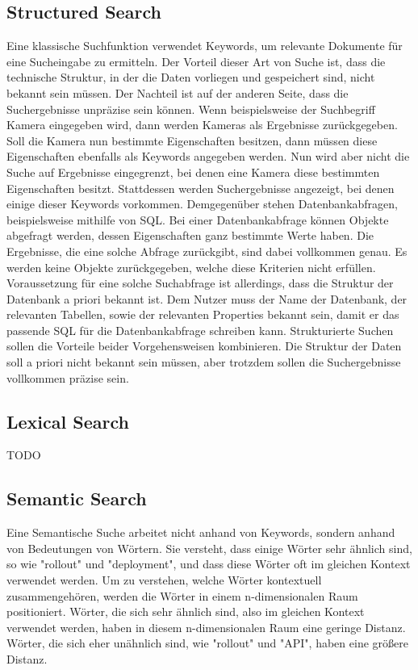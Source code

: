 \subsection{Structured Search}
Eine klassische Suchfunktion verwendet Keywords, um relevante Dokumente für eine Sucheingabe zu ermitteln.
Der Vorteil dieser Art von Suche ist, dass die technische Struktur, in der die Daten vorliegen und gespeichert sind, nicht bekannt sein müssen.
Der Nachteil ist auf der anderen Seite, dass die Suchergebnisse unpräzise sein können.
Wenn beispielsweise der Suchbegriff Kamera eingegeben wird, dann werden Kameras als Ergebnisse zurückgegeben.
Soll die Kamera nun bestimmte Eigenschaften besitzen, dann müssen diese Eigenschaften ebenfalls als Keywords angegeben werden.
Nun wird aber nicht die Suche auf Ergebnisse eingegrenzt, bei denen eine Kamera diese bestimmten Eigenschaften besitzt.
Stattdessen werden Suchergebnisse angezeigt, bei denen einige dieser Keywords vorkommen.
Demgegenüber stehen Datenbankabfragen, beispielsweise mithilfe von SQL.
Bei einer Datenbankabfrage können Objekte abgefragt werden, dessen Eigenschaften ganz bestimmte Werte haben.
Die Ergebnisse, die eine solche Abfrage zurückgibt, sind dabei vollkommen genau.
Es werden keine Objekte zurückgegeben, welche diese Kriterien nicht erfüllen.
Voraussetzung für eine solche Suchabfrage ist allerdings, dass die Struktur der Datenbank a priori bekannt ist.
Dem Nutzer muss der Name der Datenbank, der relevanten Tabellen, sowie der relevanten Properties bekannt sein, damit er das passende SQL für die Datenbankabfrage schreiben kann.
Strukturierte Suchen sollen die Vorteile beider Vorgehensweisen kombinieren.
Die Struktur der Daten soll a priori nicht bekannt sein müssen, aber trotzdem sollen die Suchergebnisse vollkommen präzise sein.


\subsection{Lexical Search}
TODO

\subsection{Semantic Search}
Eine Semantische Suche arbeitet nicht anhand von Keywords, sondern anhand von Bedeutungen von Wörtern.
Sie versteht, dass einige Wörter sehr ähnlich sind, so wie "rollout" und "deployment", und dass diese Wörter oft im gleichen Kontext verwendet werden.
Um zu verstehen, welche Wörter kontextuell zusammengehören, werden die Wörter in einem n-dimensionalen Raum positioniert.
Wörter, die sich sehr ähnlich sind, also im gleichen Kontext verwendet werden, haben in diesem n-dimensionalen Raum eine geringe Distanz.
Wörter, die sich eher unähnlich sind, wie "rollout" und "API", haben eine größere Distanz.\\

